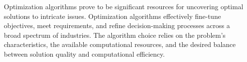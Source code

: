 Optimization algorithms prove to be significant resources for uncovering optimal solutions to intricate issues. Optimization algorithms effectively fine-tune objectives, meet requirements, and refine decision-making processes across a broad spectrum of industries. The algorithm choice relies on the problem's characteristics, the available computational resources, and the desired balance between solution quality and computational efficiency.

